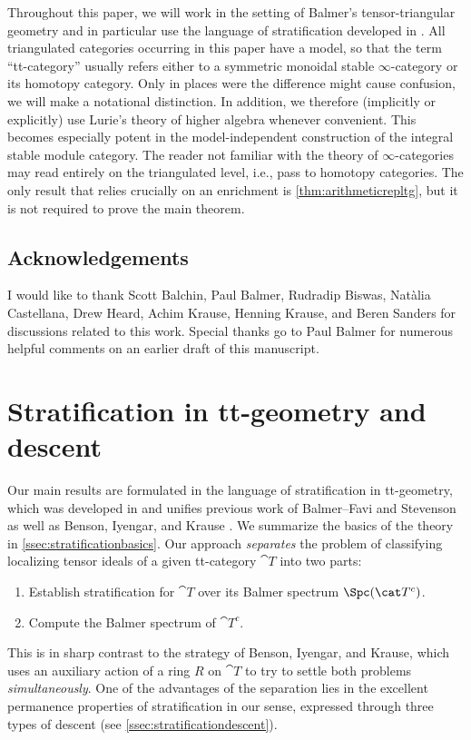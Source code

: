 \documentclass{amsart}%
\numberwithin{equation}{section}%
\theoremstyle{remark}
\newcounter{enum-resume-hack}
\begin{document}
Throughout this paper, we will work in the setting of Balmer's tensor-triangular geometry \cite{Balmer05a} and in particular use the language of stratification developed in \cite{bhs1}. All triangulated categories occurring in this paper have a model, so that the term ``tt-category'' usually refers either to a symmetric monoidal stable $\infty$-category or its homotopy category. Only in places were the difference might cause confusion, we will make a notational distinction. In addition, we therefore (implicitly or explicitly) use Lurie's theory of higher algebra \cite{HTTLurie,HALurie} whenever convenient. This becomes especially potent in the model-independent construction of the integral stable module category. The reader not familiar with the theory of $\infty$-categories may read entirely on the triangulated level, i.e., pass to homotopy categories. The only result that relies crucially on an enrichment is \cref{thm:arithmeticrepltg}, but it is not required to prove the main theorem.  

\subsection*{Acknowledgements}

I would like to thank Scott Balchin, Paul Balmer, Rudradip Biswas, Nat\`alia Castellana, Drew Heard, Achim Krause, Henning Krause, and Beren Sanders for discussions related to this work. Special thanks go to Paul Balmer for numerous helpful comments on an earlier draft of this manuscript. %


\section{Stratification in tt-geometry and descent}\label{sec:ttgeometry}

Our main results are formulated in the language of stratification in tt-geometry, which was developed in \cite{bhs1} and unifies previous work of Balmer--Favi \cite{BalmerFavi11} and Stevenson \cite{Stevenson13} as well as Benson, Iyengar, and Krause \cite{BensonIyengarKrause08,BensonIyengarKrause11b}. We summarize the basics of the theory in \cref{ssec:stratificationbasics}. Our approach \emph{separates} the problem of classifying localizing tensor ideals of a given tt-category $\cat T$ into two parts: 
\begin{enumerate}
    \item Establish stratification for $\cat T$ over its Balmer spectrum $\Spc(\cat T^c)$.
    \item Compute the Balmer spectrum of $\cat T^c$. 
\end{enumerate}
This is in sharp contrast to the strategy of Benson, Iyengar, and Krause, which uses an auxiliary action of a ring $R$ on $\cat T$ to try to settle both problems \emph{simultaneously}. One of the advantages of the separation lies in the excellent permanence properties of stratification in our sense, expressed through three types of descent (see \cref{ssec:stratificationdescent}). 
\end{document}
